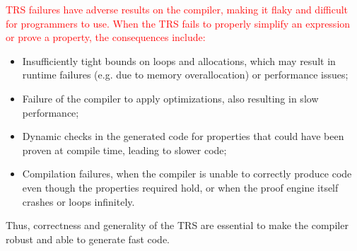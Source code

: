 \documentclass[acmsmall,review]{acmart}\settopmatter{printfolios=true,printccs=false,printacmref=false}
\newcommand{\modified}[1]{\textcolor{red}{{#1}}}
\begin{document}
\modified{TRS failures have adverse results on the compiler, making it flaky and
  difficult for programmers to use.  When the TRS fails to properly simplify an expression or
  prove a property, the consequences include: }
\begin{itemize}
\item Insufficiently tight bounds on loops and allocations, which may result in
  runtime failures (e.g. due to memory overallocation) or performance issues;

\item Failure of the compiler to apply optimizations, also resulting in slow performance;

\item Dynamic checks in the generated code for properties that could have been proven
  at compile time, leading to slower code;

\item Compilation failures, when the compiler is unable to correctly produce code
  even though the properties required hold, or when the proof engine itself crashes
  or loops infinitely.
\end{itemize}

Thus, correctness and generality of the TRS are essential to make the compiler
robust and able to generate fast code.


\end{document}
